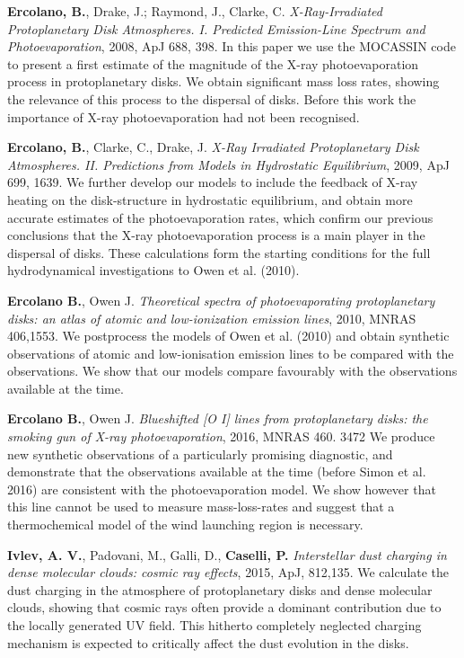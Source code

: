 \documentclass[10pt,fleqn,twoside]{article}
\begin{document}
\begin{literature}
\item \textbf{Ercolano, B.},  Drake, J.; Raymond, J., Clarke, C.
  \textit{X-Ray-Irradiated Protoplanetary Disk Atmospheres. I. Predicted Emission-Line Spectrum and Photoevaporation}, 2008, ApJ
  688, 398. In this paper we use the MOCASSIN code to present a first
  estimate of the magnitude of the X-ray photoevaporation process in
  protoplanetary disks. We obtain significant mass loss rates, showing
  the relevance of this process to the dispersal of disks. Before this work the
  importance of X-ray photoevaporation had not been recognised.  

\item \textbf{Ercolano, B.}, Clarke, C., Drake, J. \textit{X-Ray
    Irradiated Protoplanetary Disk Atmospheres. II. Predictions from
    Models in Hydrostatic Equilibrium}, 2009, ApJ 699, 1639. We
  further develop our models to include the feedback of X-ray heating
  on the disk-structure in hydrostatic equilibrium, and obtain more
  accurate estimates of the photoevaporation rates, which confirm our
  previous conclusions that the X-ray photoevaporation process is a
  main player in the dispersal of disks. These calculations form the
  starting conditions for the full hydrodynamical investigations to
  Owen et al. (2010). 

\item \textbf{Ercolano B.}, Owen J. {\em Theoretical spectra of
    photoevaporating protoplanetary disks: an atlas of atomic and
    low-ionization emission lines}, 2010, MNRAS 406,1553. We postprocess the
  models of Owen et al. (2010) and obtain synthetic observations of
  atomic and low-ionisation emission lines to be compared with the
  observations. We show that our models compare favourably with the
  observations available at the time.

\item \textbf{Ercolano B.}, Owen J.  {\em Blueshifted [O I] lines from
    protoplanetary disks: the smoking gun of X-ray photoevaporation},
  2016, MNRAS 460. 3472
  We produce new synthetic observations of a particularly promising
  diagnostic, and demonstrate that the observations available at the
  time (before Simon et al. 2016) are consistent with the
  photoevaporation model. We show however that this line cannot be
  used to measure mass-loss-rates and suggest that a thermochemical
  model of the wind launching region is necessary. 

\item \textbf{Ivlev, A. V.}, Padovani, M., Galli, D., \textbf{Caselli,
    P.} \textit{Interstellar dust charging in dense molecular clouds:
    cosmic ray effects}, 2015, ApJ, 812,135. We calculate the dust
  charging in the atmosphere of protoplanetary disks and dense
  molecular clouds, showing that cosmic rays often provide a dominant
  contribution due to the locally generated UV field. This hitherto
  completely neglected charging mechanism is expected to critically
  affect the dust evolution in the disks. 
 

\end{literature}
\end{document}
